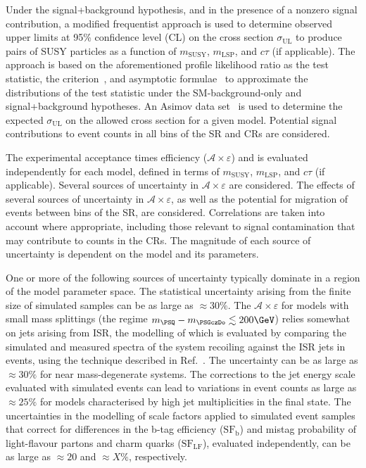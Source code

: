 Under the signal+background hypothesis, and in the presence of a
nonzero signal contribution, a modified frequentist approach is used
to determine observed upper limits at 95\% confidence level (CL) on
the cross section $\sigma_\text{UL}$ to produce pairs of SUSY
particles as a function of $m_\text{SUSY}$, $m_\text{LSP}$, and
$c\tau$ (if applicable). The approach is based on the aforementioned
profile likelihood ratio as the test statistic, the \cls
criterion~\cite{junk, read}, and asymptotic
formulae~\cite{Cowan:2010js} to approximate the distributions of the
test statistic under the SM-background-only and signal+background
hypotheses.  An Asimov data set~\cite{Cowan:2010js} is used to
determine the expected $\sigma_\text{UL}$ on the allowed cross section
for a given model. Potential signal contributions to event counts in
all bins of the SR and CRs are considered.%

The experimental acceptance times efficiency ($\mathcal{A} \times
\varepsilon$) and is evaluated independently for each model, defined
in terms of $m_\text{SUSY}$, $m_\text{LSP}$, and $c\tau$ (if
applicable). Several sources of uncertainty in $\mathcal{A} \times
\varepsilon$ are considered. The effects of several sources of
uncertainty in $\mathcal{A} \times \varepsilon$, as well as the
potential for migration of events between bins of the SR, are
considered. Correlations are taken into account where appropriate,
including those relevant to signal contamination that may contribute
to counts in the CRs. The magnitude of each source of uncertainty is
dependent on the model and its parameters.

One or more of the following sources of uncertainty typically dominate
in a region of the model parameter space. The statistical uncertainty
arising from the finite size of simulated samples can be as large as
${\approx}30\%$. The $\mathcal{A} \times \varepsilon$ for models with
small mass splittings (\ie the regime $m_{\PSQ} - m_{\PSGczDo}
\lesssim 200\GeV$) relies somewhat on jets arising from ISR, the
modelling of which is evaluated by comparing the simulated and
measured \pt spectra of the system recoiling against the ISR jets in
\ttbar events, using the technique described in
Ref.~\cite{single-lepton-stop}. The uncertainty can be as large as
${\approx}30\%$ for near mass-degenerate systems. The corrections to
the jet energy scale evaluated with simulated events can lead to
variations in event counts as large as ${\approx}25\%$ for models
characterised by high jet multiplicities in the final state. The
uncertainties in the modelling of scale factors applied to simulated
event samples that correct for differences in the b-tag efficiency
($\text{SF}_\text{b}$) and mistag probability of light-flavour partons
and charm quarks ($\text{SF}_\text{LF}$), evaluated independently, can
be as large as ${\approx}20$ and ${\approx}X\%$, respectively.

